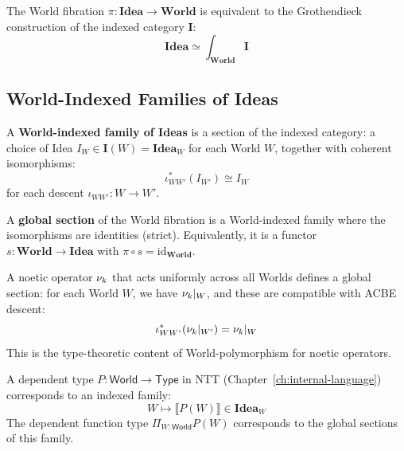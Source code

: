\begin{corollary}
\label{cor:world-fib-grothendieck}
The World fibration $\pi : \mathbf{Idea} \to \mathbf{World}$ is equivalent to
the Grothendieck construction of the indexed category $\mathbf{I}$:
\[
  \mathbf{Idea} \simeq \int_{\mathbf{World}} \mathbf{I}
\]
\end{corollary}

\subsection{World-Indexed Families of Ideas}
\label{subsec:world-indexed-families}

\begin{definition}
\label{def:world-indexed-family}
A \textbf{World-indexed family of Ideas} is a section of the indexed category:
a choice of Idea $I_W \in \mathbf{I}(W) = \mathbf{Idea}_W$ for each World $W$,
together with coherent isomorphisms:
\[
  \iota_{WW'}^*(I_{W'}) \cong I_W
\]
for each descent $\iota_{WW'} : W \to W'$.
\end{definition}

\begin{definition}
\label{def:global-section}
A \textbf{global section} of the World fibration is a World-indexed family
where the isomorphisms are identities (strict). Equivalently, it is a
functor $s : \mathbf{World} \to \mathbf{Idea}$ with $\pi \circ s = \mathrm{id}_{\mathbf{World}}$.
\end{definition}

\begin{example}
\label{ex:noetic-global-section}
A noetic operator $\nu_{k}$ that acts uniformly across all Worlds defines
a global section: for each World $W$, we have $\nu_{k}|_W$, and these
are compatible with ACBE descent:
\[
  \iota_{WW'}^*(\nu_{k}|_{W'}) = \nu_{k}|_W
\]
This is the type-theoretic content of World-polymorphism for noetic operators.
\end{example}

\begin{definition}
\label{def:dependent-type-indexed}
A dependent type $P : \mathsf{World} \to \mathsf{Type}$ in NTT
(Chapter~\ref{ch:internal-language}) corresponds to an indexed family:
\[
  W \mapsto \llbracket P(W) \rrbracket \in \mathbf{Idea}_W
\]
The dependent function type $\Pi_{W : \mathsf{World}} P(W)$ corresponds to
the global sections of this family.
\end{definition}

